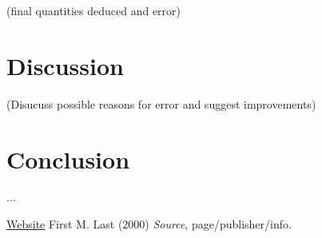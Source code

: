\documentclass[12pt]{article}
\begin{document}
	\begin{center}
	\end{center}
	
	(final quantities deduced and error)
	
	\section{Discussion}
	(Disucuss possible reasons for error and suggest improvements)	

	\section{Conclusion}
	...
	
	\begin{thebibliography}{}
		\href{URL}{Website}
		First M. Last (2000) \emph{Source}, page/publisher/info.		
	\end{thebibliography}
	
\end{document}
